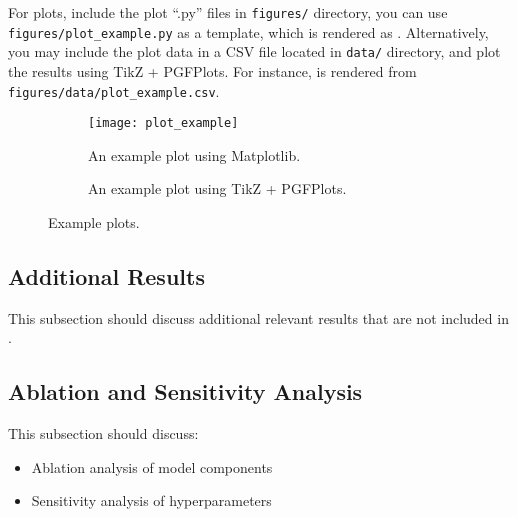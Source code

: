 For plots,
include the plot ``.py'' files
in \verb|figures/| directory,
you can use \verb|figures/plot_example.py| as a template,
which is rendered as .
Alternatively,
you may include the plot data
in a CSV file located in \verb|data/| directory,
and plot the results using TikZ + PGFPlots.
For instance,
 is rendered
from \verb|figures/data/plot_example.csv|.

\begin{figure}[ht]
    \centering
    \hpad
    \begin{subfigure}{0.45\linewidth}
        \centering
        \texttt{[image: plot\_example]}
        \caption{%
            An example plot using Matplotlib.
        }\label{fig:plot:matplotlib}
    \end{subfigure}
    \hpad
    \begin{subfigure}{0.45\textwidth}
        \centering
        \caption{%
            An example plot using TikZ + PGFPlots.
        }\label{fig:plot:tikz}
    \end{subfigure}
    \hpad
    \caption{%
        Example plots.
    }\label{fig:plot}
\end{figure}

\subsection{Additional Results}\label{sec:results:additional}

This subsection should discuss
additional relevant results
that are not included
in .

\subsection{Ablation and Sensitivity Analysis}\label{sec:results:ablation}

This subsection should discuss:
\begin{itemize}
    \item Ablation analysis of model components
    \item Sensitivity analysis of hyperparameters
\end{itemize}
